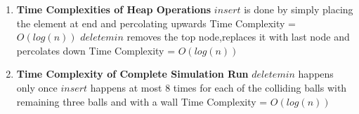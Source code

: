 \documentclass[a4paper,11pt]{article}
\begin{document}
\begin{enumerate}
 \item \textbf{Time Complexities of Heap Operations}\newline
 $insert$ is done by simply placing the element at end and percolating upwards\newline
 Time Complexity = $O(log(n))$\newline
 $deletemin$ removes the top node,replaces it with last node and percolates down\newline
 Time Complexity = $O(log(n))$\newline
 
  \item \textbf{Time Complexity of Complete Simulation Run}\newline 
  $deletemin$ happens only once\newline
  $insert$ happens at most 8 times for each of the colliding balls with remaining three balls and with a wall\newline
  Time Complexity = $O(log(n))$\newline
 

\end{enumerate}
\end{document}
